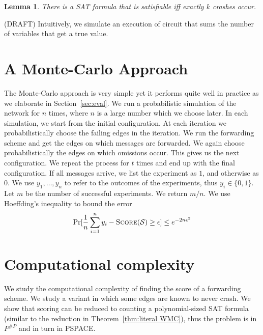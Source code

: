 \documentclass[11pt,eepic]{article}
\newcommand{\set}[1]{\{ #1  \}}
\renewcommand{\S}{{\cal S}}
\newcommand{\score}{\mbox{\sc Score}}
\newtheorem{lemma}[theorem]{Lemma}
\def\eod{\vrule height 6pt width 5pt depth 0pt}
\newenvironment{proof}{\noindent {\bf Proof:} \hspace{.677em}}
	                      {\hspace*{\fill}{\eod}}
\begin{document}
		\begin{lemma}
		\label{lem:k crash sat}
		There is a SAT formula that is satisfiable iff exactly $k$ crashes occur.
		\end{lemma}
		\begin{proof}
		(DRAFT) Intuitively, we simulate an execution of circuit that sums the number of variables that get a true value.
		\end{proof}




\section{A Monte-Carlo Approach}
\label{sec:monte-carlo}
	The Monte-Carlo approach is very simple yet it performs quite well in practice as we elaborate in Section~\ref{sec:eval}. We run a probabilistic simulation of the network for $n$ times, where $n$ is a large number which we choose later. In each simulation, we start from the initial configuration. At each iteration we probabilistically choose the failing edges in the iteration. We run the forwarding scheme and get the edges on which messages are forwarded. We again choose probabilistically the edges on which omissions occur. This gives us the next configuration. We repeat the process for $t$ times and end up with the final configuration. If all messages arrive, we list the experiment as $1$, and otherwise as $0$. We use $y_1, \ldots, y_n$ to refer to the outcomes of the experiments, thus $y_i \in \set{0,1}$. Let $m$ be the number of successful experiments. We return $m/n$. We use Hoeffding's inequality to bound the error \[\Pr[\frac{1}{n}\sum_{i=1}^n y_i - \score(\S) \geq \epsilon] \leq e^{-2n\epsilon^2}\]





\section{Computational complexity}
	We study the computational complexity of finding the score of a forwarding scheme. We study a variant in which some edges are known to never crash. We show that scoring can be reduced to counting a polynomial-sized SAT formula (similar to the reduction in Theorem~\ref{thm:literal WMC}), thus the problem is in $P^{\#P}$ and in turn in PSPACE.
\end{document}
